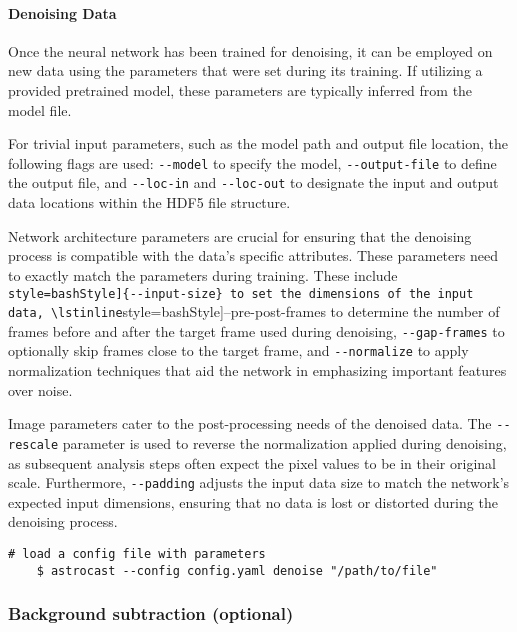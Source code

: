 \paragraph{Denoising Data}
Once the neural network has been trained for denoising, it can be employed on new data using the parameters that were
set during its training. If utilizing a provided pretrained model, these parameters are typically inferred
from the model file.

For trivial input parameters, such as the model path and output file location, the following flags are used: \lstinline[style=bashStyle]{--model} to specify the model, \lstinline[style=bashStyle]{--output-file} to define the output file, and \lstinline[style=bashStyle]{--loc-in} and \lstinline[style=bashStyle]{--loc-out} to designate the input and output data locations within the HDF5 file structure.

Network architecture parameters are crucial for ensuring that the denoising process is compatible with the data's
specific attributes. These parameters need to exactly match the parameters during training. These include \lstinline[
    style=bashStyle]{--input-size} to set the dimensions of the input data, \lstinline[style=bashStyle]{--pre-post-frames}
to determine the number of frames before and after the target frame used during denoising, \lstinline[style=bashStyle]{--gap-frames} to optionally skip frames close to the target frame, and \lstinline[style=bashStyle]{--normalize} to apply normalization techniques that aid the network in emphasizing important features over noise.

Image parameters cater to the post-processing needs of the denoised data. The \lstinline[style=bashStyle]{--rescale}
parameter is used to reverse the normalization applied during denoising, as subsequent analysis steps often expect
the pixel values to be in their original scale. Furthermore, \lstinline[style=bashStyle]{--padding} adjusts the input
data size to match the network's expected input dimensions, ensuring that no data is lost or distorted during the
denoising process.

\begin{lstlisting}[style=bashStyle]
    # load a config file with parameters
    $ astrocast --config config.yaml denoise "/path/to/file"
\end{lstlisting}


\subsubsection{Background subtraction (optional)}
\label{subsubsec:background}

